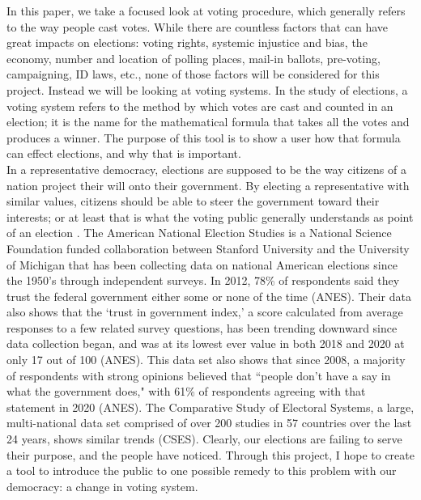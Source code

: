 \documentclass[12pt]{article}
\begin{document}
\qquad In this paper, we take a focused look at voting procedure, which generally refers to the way people cast votes. While there are countless factors that can have great impacts on elections: voting rights, systemic injustice and bias, the economy, number and location of polling places, mail-in ballots, pre-voting, campaigning, ID laws, etc., none of those factors will be considered for this project. Instead we will be looking at voting systems. In the study of elections, a voting system refers to the method by which votes are cast and counted in an election; it is the name for the mathematical formula that takes all the votes and produces a winner. The purpose of this tool is to show a user how that formula can effect elections, and why that is important. \\

\qquad In a representative democracy, elections are supposed to be the way citizens of a nation project their will onto their government. By electing a representative with similar values, citizens should be able to steer the government toward their interests; or at least that is what the voting public generally understands as point of an election \parencite{przeworski}. The American National Election Studies is a National Science Foundation funded collaboration between Stanford University and the University of Michigan that has been collecting data on national American elections since the 1950's through independent surveys. In 2012, 78\% of respondents said they trust the federal government either some or none of the time (ANES). Their data also shows that the `trust in government index,' a score calculated from average responses to a few related survey questions, has been trending downward since data collection began, and was at its lowest ever value in both 2018 and 2020 at only 17 out of 100 (ANES). This data set also shows that since 2008, a majority of respondents with strong opinions believed that ``people don't have a say in what the government does," with 61\% of respondents agreeing with that statement in 2020 (ANES). The Comparative Study of Electoral Systems, a large, multi-national data set comprised of over 200 studies in 57 countries over the last 24 years, shows similar trends (CSES). Clearly, our elections are failing to serve their purpose, and the people have noticed. Through this project, I hope to create a tool to introduce the public to one possible remedy to this problem with our democracy: a change in voting system. \\
\end{document}
